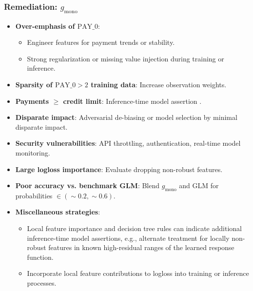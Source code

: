 \documentclass[11pt,
               aspectratio=169,
               hyperref={colorlinks}
               ]{beamer}
\begin{document}
			\begin{frame}
		
				\frametitle{\textbf{Remediation}: $g_{\text{mono}}$}
				
				\begin{itemize}\scriptsize
					\item \textbf{Over-emphasis of $\text{PAY\_0}$}:
					\begin{itemize}\scriptsize
						\item Engineer features for payment trends or stability.
						\item Strong regularization or missing value injection during training or inference.
					\end{itemize}
					\item \textbf{Sparsity of $\text{PAY\_0} > 2$ training data}: Increase observation weights. 
					\item \textbf{Payments $\geq$ credit limit}: Inference-time model assertion \cite{kangdebugging}. 
					\item \textbf{Disparate impact}: Adversarial de-biasing \cite{zhang2018mitigating} or model selection by minimal disparate impact. 
					\item \textbf{Security vulnerabilities}: API throttling, authentication, real-time model monitoring. 
					\item \textbf{Large logloss importance}: Evaluate dropping non-robust features.
					\item \textbf{Poor accuracy vs. benchmark GLM}: Blend $g_{\text{mono}}$ and GLM for probabilities $\in (\sim0.2, \sim0.6)$.
					\item \textbf{Miscellaneous strategies}: 
					\begin{itemize}\scriptsize
						\item Local feature importance and decision tree rules can indicate additional inference-time model assertions, e.g., alternate treatment for locally non-robust features in known high-residual ranges of the learned response function. 
						\item Incorporate local feature contributions to logloss into training or inference processes.
					\end{itemize}
				\end{itemize}
				\normalsize

			\end{frame}		
			
\end{document}
